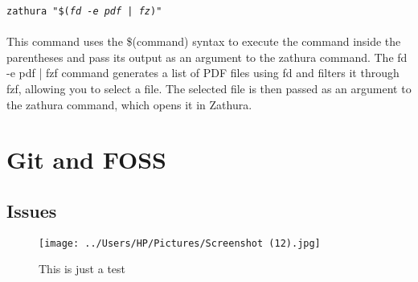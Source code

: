 \documentclass[12pt]{article}
\begin{document}
\texttt{zathura "\$(\textit{fd -e pdf | fz})"}\\
\\This command uses the \$(command) syntax to execute the command inside the parentheses and pass its output as an argument to the zathura command. The fd -e pdf | fzf command generates a list of PDF files using fd and filters it through fzf, allowing you to select a file. The selected file is then passed as an argument to the zathura command, which opens it in Zathura.

\section{Git and FOSS}
\subsection{Issues}

\begin{figure}[h]
    \centering
    \texttt{[image: ../Users/HP/Pictures/Screenshot (12).jpg]}
	\caption{This is just a test}
	
\end{figure}
\end{document}
